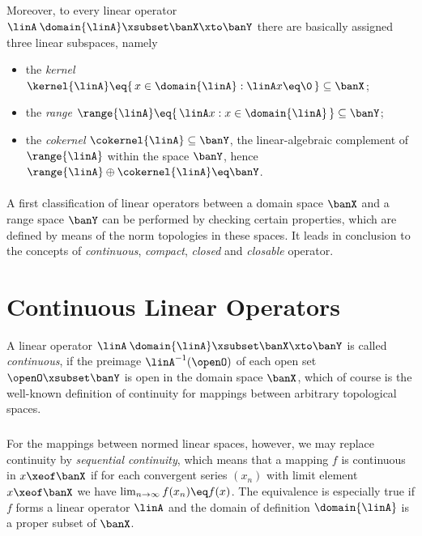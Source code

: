 \documentclass[11pt,twoside]{article}
\begin{document}
\subparagraph{} %
Moreover,
to every linear operator $\linA\:\domain{\linA} \xsubset \banX \xto \banY$
there are basically assigned three linear subspaces,
namely

\begin{itemize}[leftmargin=12pt]
\item[1.]
the \textit{kernel} $\kernel{\linA} \eq
\{\,x \in \domain{\linA}: \linA x \eq \0\,\} \subseteq \banX$;

\item[2.]
the \textit{range} $\range{\linA} \eq
\{\, \linA x: x \in \domain{\linA}\,\} \subseteq \banY$;

\item[3.]
the \textit{cokernel} $\cokernel{\linA} \subseteq \banY$,
{\ie} the linear-algebraic complement of $\range{\linA}$
within the space $\banY$,
hence
$\range{\linA} \oplus \cokernel{\linA} \eq \banY$.
\end{itemize}

\paragraph{} %
A first classification of linear operators
between a domain space $\banX$ and a range space $\banY$
can be performed by checking certain properties,
which are defined by means of the norm topologies in these spaces.
It leads in conclusion to the concepts of \textit{continuous}, \textit{compact},
\textit{closed} and \textit{closable} operator.

\section{Continuous Linear Operators}
A linear operator $\linA \: \domain{\linA} \xsubset \banX \xto \banY$
is called \textit{continuous},
if the preimage $\linA^{-1}(\openO)$ of each open set $\openO \xsubset \banY$
is open in the domain space $\banX$,
which of course is the well-known definition of continuity
for mappings between arbitrary topological spaces.

\subparagraph{} %
For the mappings between normed linear spaces,
however,
we may replace continuity by \textit{sequential continuity},
which means that a mapping $f$ is continuous in $x \xeof \banX$
if for each convergent series $(x_n)$ with limit element $x \xeof \banX$
we have $\lim_{n \to \infty} f(x_n) \eq f(x)$.
The equivalence is especially true
if $f$ forms a linear operator $\linA$
and the domain of definition $\domain{\linA}$ is a proper subset of $\banX$.
\end{document}
